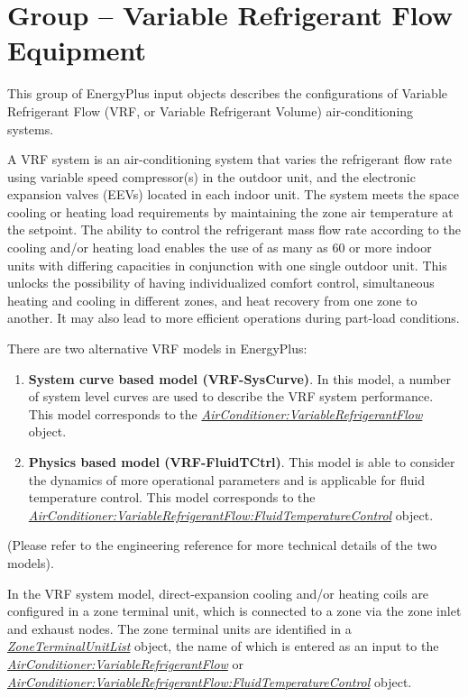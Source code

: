 \section{Group -- Variable Refrigerant Flow Equipment}\label{group-variable-refrigerant-flow-equipment}

This group of EnergyPlus input objects describes the configurations of Variable Refrigerant Flow (VRF, or Variable Refrigerant Volume) air-conditioning systems.

A VRF system is an air-conditioning system that varies the refrigerant flow rate using variable speed compressor(s) in the outdoor unit, and the electronic expansion valves (EEVs) located in each indoor unit. The system meets the space cooling or heating load requirements by maintaining the zone air temperature at the setpoint. The ability to control the refrigerant mass flow rate according to the cooling and/or heating load enables the use of as many as 60 or more indoor units with differing capacities in conjunction with one single outdoor unit. This unlocks the possibility of having individualized comfort control, simultaneous heating and cooling in different zones, and heat recovery from one zone to another. It may also lead to more efficient operations during part-load conditions.

There are two alternative VRF models in EnergyPlus:

\begin{enumerate}
\def\labelenumi{\arabic{enumi}.}
\item
  \textbf{System curve based model (VRF-SysCurve)}. In this model, a number of system level curves are used to describe the VRF system performance. This model corresponds to the \emph{\hyperref[airconditionervariablerefrigerantflow]{AirConditioner:VariableRefrigerantFlow}} object.
\item
  \textbf{Physics based model (VRF-FluidTCtrl)}. This model is able to consider the dynamics of more operational parameters and is applicable for fluid temperature control. This model corresponds to the \emph{\hyperref[airconditionervariablerefrigerantflowfluidtemperaturecontrol]{AirConditioner:VariableRefrigerantFlow:FluidTemperatureControl}} object.
\end{enumerate}

(Please refer to the engineering reference for more technical details of the two models).

In the VRF system model, direct-expansion cooling and/or heating coils are configured in a zone terminal unit, which is connected to a zone via the zone inlet and exhaust nodes. The zone terminal units are identified in a \emph{\hyperref[zoneterminalunitlist]{ZoneTerminalUnitList}} object, the name of which is entered as an input to the \emph{\hyperref[airconditionervariablerefrigerantflow]{AirConditioner:VariableRefrigerantFlow}} or \emph{\hyperref[airconditionervariablerefrigerantflowfluidtemperaturecontrol]{AirConditioner:VariableRefrigerantFlow:FluidTemperatureControl}} object.

